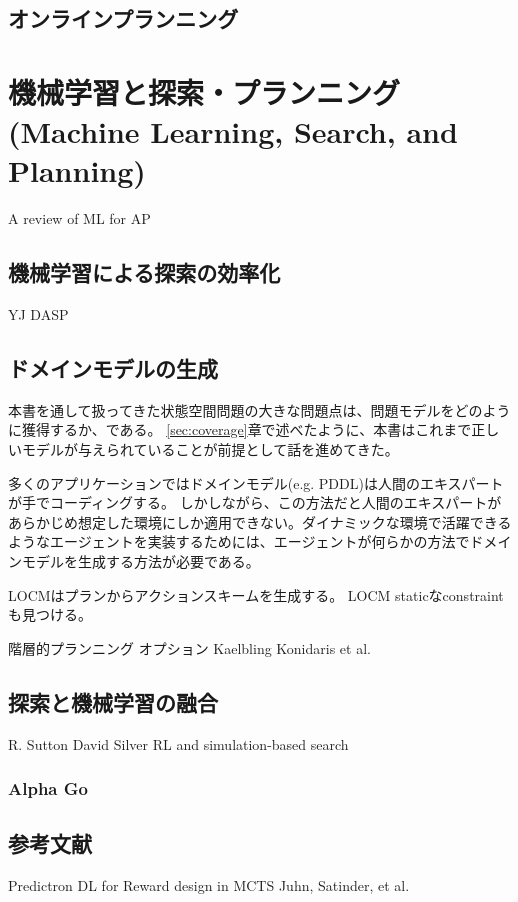 \documentclass[b5paper]{report}
\begin{document}
\section{オンラインプランニング}
\label{sec:online-planning}



\chapter{機械学習と探索・プランニング (Machine Learning, Search, and Planning)}
\label{ch:machine-learning}
A review of ML for AP \cite{jimenez2012review}


\section{機械学習による探索の効率化}
\label{sec:ml-for-search}
YJ DASP

\section{ドメインモデルの生成}
\label{sec:domain-acquisition}

本書を通して扱ってきた状態空間問題の大きな問題点は、問題モデルをどのように獲得するか、である。
\ref{sec:coverage}章で述べたように、本書はこれまで正しいモデルが与えられていることが前提として話を進めてきた。

多くのアプリケーションではドメインモデル(e.g. PDDL)は人間のエキスパートが手でコーディングする。
しかしながら、この方法だと人間のエキスパートがあらかじめ想定した環境にしか適用できない。ダイナミックな環境で活躍できるようなエージェントを実装するためには、エージェントが何らかの方法でドメインモデルを生成する方法が必要である。

LOCMはプランからアクションスキームを生成する。
LOCM staticなconstraintも見つける。

階層的プランニング
オプション
Kaelbling
Konidaris et al.

\section{探索と機械学習の融合}
\label{sec:search-and-ml}
R. Sutton
David Silver RL and simulation-based search

\subsection{Alpha Go}
\label{sec:alpha-go}

\section{参考文献}
Predictron
DL for Reward design in MCTS
Juhn, Satinder, et al.


\printindex




\end{document}
